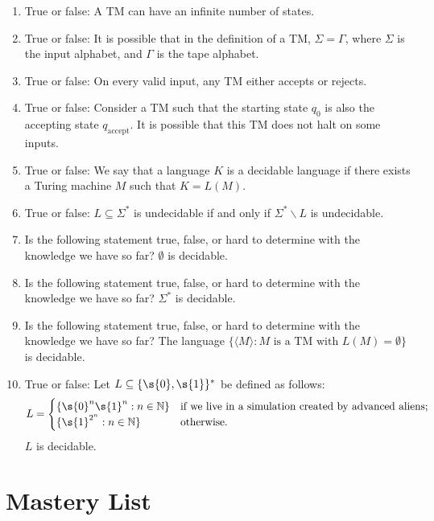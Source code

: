 \begin{enumerate}
    \item True or false: A TM can have an infinite number of states.
    \item True or false: It is possible that in the definition of a TM, $\Sigma = \Gamma$, where $\Sigma$ is the input alphabet, and $\Gamma$ is the tape alphabet.
    \item True or false: On every valid input, any TM either accepts or rejects.
    \item True or false: Consider a TM such that the starting state $q_0$ is also the accepting state $q_{\text{accept}}$. It is possible that this TM does not halt on some inputs.
    \item True or false: We say that a language $K$ is a decidable language if there exists a Turing machine $M$ such that $K = L(M)$.
    \item True or false: $L \subseteq \Sigma^*$ is undecidable if and only if $\Sigma^* \backslash L$ is undecidable. 
    \item Is the following statement true, false, or hard to determine with the knowledge we have so far? $\emptyset$ is decidable.
    \item Is the following statement true, false, or hard to determine with the knowledge we have so far? $\Sigma^*$ is decidable.
    \item Is the following statement true, false, or hard to determine with the knowledge we have so far? The language $\{\langle M \rangle : \text{$M$ is a TM with $L(M) = \emptyset$}\}$ is decidable.
    \item True or false: Let $L \subseteq \{\s{0},\s{1}\}^*$ be defined as follows:
    \[
        L = \begin{cases}
        \{\s{0}^n\s{1}^n : n \in \mathbb{N}\} & \text{if we live in a simulation created by advanced aliens;} \\
        \{\s{1}^{2^n} : n \in \mathbb{N}\} & \text{otherwise.}
        \end{cases}
    \]
    $L$ is decidable. 
\end{enumerate}




\section{Mastery List}

